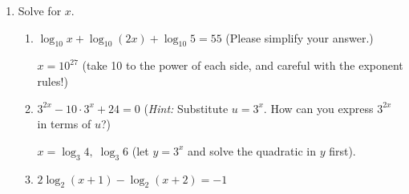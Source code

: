 \documentclass{article}
\begin{document}
\begin{enumerate}
\begin{enumerate}
    \begin{problem}[\vfill\newpage]
      Find a formula for $f^{-1}(x)$.
    \end{problem}

    \begin{solution}
      We start with $y = \frac{\ln(\sqrt{3y})}{2}+3$, switch $x$ and $y$ (since an inverse function switches the input and output), and solve for $y$:
      \begin{align*}
        x &= \frac{\ln(\sqrt{3y})}{2}+3 \\
        x-3  &=  \frac{\ln(\sqrt{3y})}{2} \\
        2(x-3)  &=  \ln(\sqrt{3y})  \\
        e^{2(x-3)} &= \sqrt{3y} \\
        e^{4(x-3)}  &=  3y \\
        \boxed{\frac{e^{4(x-3) } }{3}} &= y
      \end{align*} 
    \end{solution}

  \end{enumerate}

\item  Solve for $x$.
  \begin{enumerate}
  \item
    \begin{problem}[\vfill]
      $ \log_{10} x + \log_{10} (2x) + \log_{10} 5 = 55$ (Please simplify your answer.) 
    \end{problem}

    \begin{solution}
      $ x=10^{27}$ (take 10 to the power of each side, and careful with the exponent rules!)
    \end{solution}

  \item
    \begin{problem}[\vfill]
      $ 3^{2x} - 10 \cdot 3^{x} + 24 = 0 $ (\emph{Hint:} Substitute $u = 3^x$. How can you express $3^{2x}$ in terms of $u$?) 
    \end{problem}

    \begin{solution}
      $x=\log_3 4, \; \log_3 6 $ (let $y=3^x$ and solve the quadratic in $y$ first).
    \end{solution}

  \item
    \begin{problem}[\vfill\newpage]
      $2 \log_2 (x+1) - \log_2 (x+2) = -1 $
    \end{problem}


\end{enumerate}
\end{enumerate}
\end{document}
